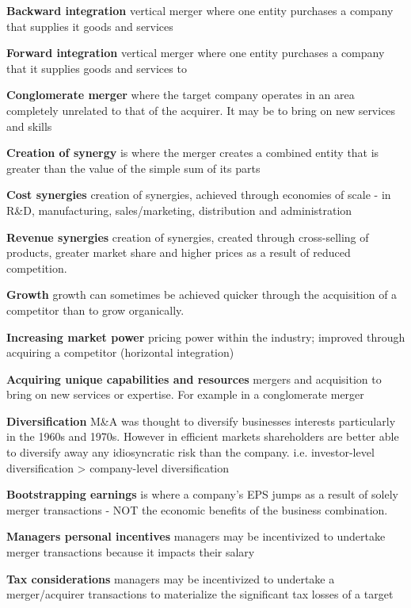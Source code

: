 \documentclass[12pt]{article}
\begin{document}
			\textbf{Backward integration} vertical merger where one entity purchases a company that supplies it goods and services
			
			\textbf{Forward integration} vertical merger where one entity purchases a company that it supplies goods and services to
			
			\textbf{Conglomerate merger} where the target company operates in an area completely unrelated to that of the acquirer. It may be to bring on new services and skills
			
			\textbf{Creation of synergy} is where the merger creates a combined entity that is greater than the value of the simple sum of its parts
			
			\textbf{Cost synergies} creation of synergies, achieved through economies of scale - in R&D, manufacturing, sales/marketing, distribution and administration
			
			\textbf{Revenue synergies} creation of synergies, created through cross-selling of products, greater market share and higher prices as a result of reduced competition.
			
			\textbf{Growth}  growth can sometimes be achieved quicker through the acquisition of a competitor than to grow organically.
			
			\textbf{Increasing market power} pricing power within the industry; improved through acquiring a competitor (horizontal integration)
			
			\textbf{Acquiring unique capabilities and resources} mergers and acquisition to bring on new services or expertise. For example in a conglomerate merger
			
			\textbf{Diversification} M\&A was thought to diversify businesses interests particularly in the 1960s and 1970s. However in efficient markets shareholders are better able to diversify away any idiosyncratic risk than the company. i.e. investor-level diversification > company-level diversification
			
			\textbf{Bootstrapping earnings} is where a company's EPS jumps as a result of solely merger transactions - NOT the economic benefits of the business combination. 
			
			\textbf{Managers personal incentives} managers may be incentivized to undertake merger transactions because it impacts their salary
			
			\textbf{Tax considerations} managers may be incentivized to undertake a merger/acquirer transactions to materialize the significant tax losses of a target
			
\end{document}
